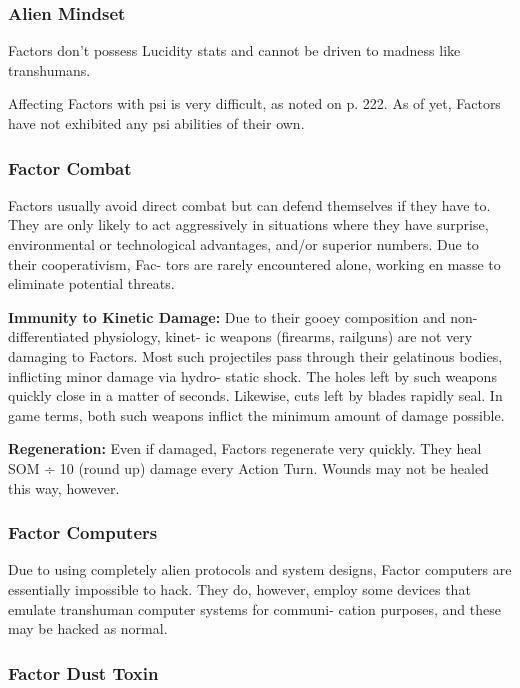 \subsubsection{Alien Mindset}

Factors don't possess Lucidity stats and cannot be 
driven to madness like transhumans.

Affecting Factors with psi is very difficult, as noted 
on p. 222. As of yet, Factors have not exhibited any 
psi abilities of their own.

\subsubsection{Factor Combat }

Factors usually avoid direct combat but can defend 
themselves if they have to. They are only likely to act 
aggressively in situations where they have surprise, 
environmental or technological advantages, and/or 
superior numbers. Due to their cooperativism, Fac-
tors are rarely encountered alone, working en masse 
to eliminate potential threats.

\textbf{Immunity to Kinetic Damage: }Due to their gooey 
composition and non-differentiated physiology, kinet-
ic weapons (firearms, railguns) are not very damaging 
to Factors. Most such projectiles pass through their 
gelatinous bodies, inflicting minor damage via hydro-
static shock. The holes left by such weapons quickly 
close in a matter of seconds. Likewise, cuts left by 
blades rapidly seal. In game terms, both such weapons 
inflict the minimum amount of damage possible. 

\textbf{Regeneration: }Even if damaged, Factors regenerate 
very quickly. They heal SOM ÷ 10 (round up) damage 
every Action Turn. Wounds may not be healed this 
way, however. 

\subsubsection{Factor Computers}

Due to using completely alien protocols and system 
designs, Factor computers are essentially impossible 
to hack. They do, however, employ some devices that 
emulate transhuman computer systems for communi-
cation purposes, and these may be hacked as normal.

\subsubsection{Factor Dust Toxin}

